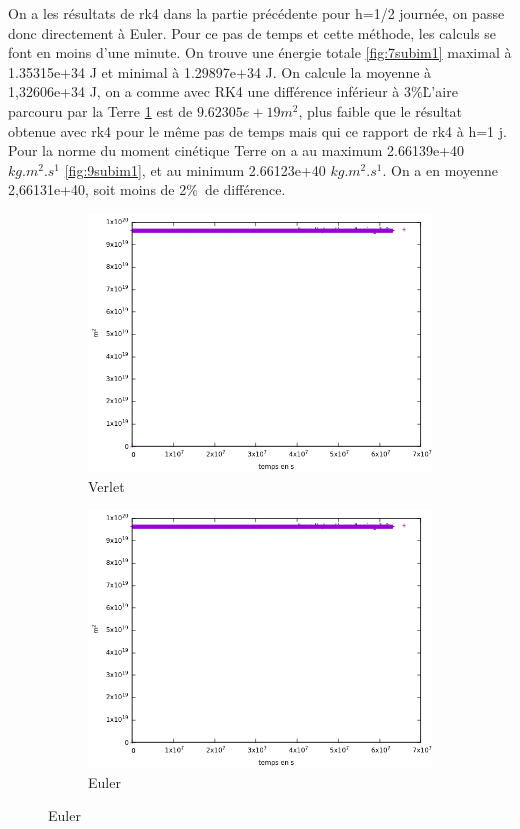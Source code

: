 \documentclass[11pt]{article}
\begin{document}
On a les résultats de rk4 dans la partie précédente pour h=1/2 journée, on passe donc directement à Euler. Pour ce pas de temps et cette méthode, les calculs se font en moins d'une minute. On trouve une énergie totale \ref{fig:7subim1} maximal à 1.35315e+34 J et minimal à 1.29897e+34 J. On calcule la moyenne à 1,32606e+34 J, on a comme avec RK4 une différence inférieur à 3\%\. 
L'aire parcouru par la Terre \ref{fig:8subim1} est de \(9.62305e+19 m^2\), plus faible que le résultat obtenue avec rk4 pour le même pas de temps mais qui ce rapport de rk4 à h=1 j. Pour la norme du moment cinétique Terre on a au maximum 2.66139e+40 \(kg.m^2.s^1\) \ref{fig:9subim1}, et au minimum 2.66123e+40 \(kg.m^2.s^1\). On a en moyenne 2,66131e+40, soit moins de 2\%\ de différence.

\begin{figure}[H]
\begin{subfigure}{0.5\textwidth}
\includegraphics[width=1\linewidth]{eulerverlet/aire_terre_verlet.png}
\caption{Verlet}
\label{fig:8subim1}
\end{subfigure}
\begin{subfigure}{0.5\textwidth}
\includegraphics[width=1\linewidth]{eulerverlet/aire_terre_euler.png}
\caption{Euler}
\label{fig:8subim2}
\end{subfigure}


\end{figure}
\end{document}
